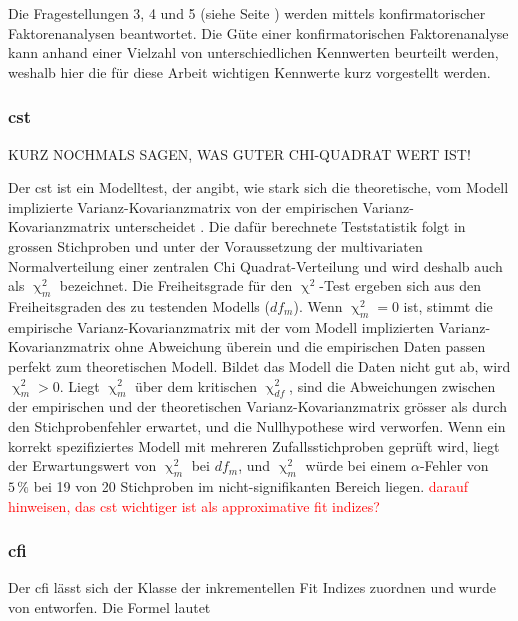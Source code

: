 \documentclass[11pt, twoside, a4paper]{book}		%
\begin{document}
Die Fragestellungen 3, 4 und 5 (siehe Seite \pageref{text:Fragestellung3}) werden mittels konfirmatorischer Faktorenanalysen beantwortet. Die Güte einer konfirmatorischen Faktorenanalyse kann anhand einer Vielzahl von unterschiedlichen Kennwerten beurteilt werden, weshalb hier die für diese Arbeit wichtigen Kennwerte kurz vorgestellt werden.









\subsubsection*{\gls{cst}}

KURZ NOCHMALS SAGEN, WAS GUTER CHI-QUADRAT WERT IST!

Der \gls{cst} ist ein Modelltest, der angibt, wie stark sich die theoretische, vom Modell implizierte Var\-ianz-Ko\-var\-ianz\-ma\-trix von der empirischen Var\-ianz-Ko\-var\-ianz\-ma\-trix unterscheidet \citep{Kline2011}. Die dafür berechnete Teststatistik folgt in grossen Stichproben und unter der Voraussetzung der multivariaten Normalverteilung einer zentralen Chi Quad\-rat-Ver\-teil\-ung und wird deshalb auch als $\upchi^2_{m}$ bezeichnet. Die Freiheitsgrade für den $\upchi^2$-Test ergeben sich aus den Freiheitsgraden des zu testenden Modells ($df_{m}$). Wenn $\upchi^2_{m}=0$ ist, stimmt die empirische Var\-ianz-Ko\-var\-ianz\-ma\-trix mit der vom Modell implizierten Varianz-Kovarianzmatrix ohne Abweichung überein und die empirischen Daten passen perfekt zum theoretischen Modell. Bildet das Modell die Daten nicht gut ab, wird $\upchi^2_{m}>0$. Liegt $\upchi^2_{m}$ über dem kritischen $\upchi^2_{df}$, sind die Abweichungen zwischen der empirischen und der theoretischen Varianz-Kovarianzmatrix grösser als durch den Stichprobenfehler erwartet, und die Nullhypothese wird verworfen. Wenn ein korrekt spezifiziertes Modell mit mehreren Zufallsstichproben geprüft wird, liegt der Erwartungswert von $\upchi^2_{m}$ bei $df_{m}$, und $\upchi^2_{m}$ würde bei einem $\alpha$-Fehler von $5\,\%$ bei 19 von 20 Stichproben im nicht-signifikanten Bereich liegen.
\textcolor{red}{darauf hinweisen, das cst wichtiger ist als approximative fit indizes?}

\subsubsection*{\gls{cfi}}
Der \gls{cfi} lässt sich der Klasse der inkrementellen Fit Indizes zuordnen und wurde von \citet{Bentler1990} entworfen. Die Formel lautet
\end{document}
